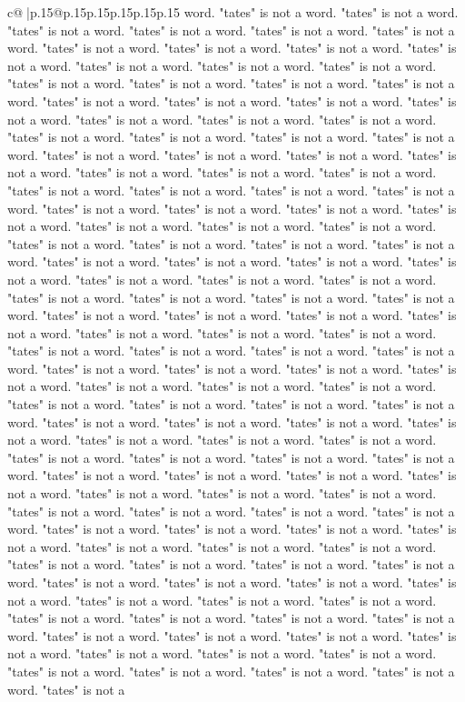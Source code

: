 \documentclass{article}
\begin{document}
{\begin{supertabular}{c@{$\;$}|p{.15\linewidth}@{}p{.15\linewidth}p{.15\linewidth}p{.15\linewidth}p{.15\linewidth}p{.15\linewidth}}
{{{word. "tates" is not a word. "tates" is not a word. "tates" is not a word. "tates" is not a word. "tates" is not a word. "tates" is not a word. "tates" is not a word. "tates" is not a word. "tates" is not a word. "tates" is not a word. "tates" is not a word. "tates" is not a word. "tates" is not a word. "tates" is not a word. "tates" is not a word. "tates" is not a word. "tates" is not a word. "tates" is not a word. "tates" is not a word. "tates" is not a word. "tates" is not a word. "tates" is not a word. "tates" is not a word. "tates" is not a word. "tates" is not a word. "tates" is not a word. "tates" is not a word. "tates" is not a word. "tates" is not a word. "tates" is not a word. "tates" is not a word. "tates" is not a word. "tates" is not a word. "tates" is not a word. "tates" is not a word. "tates" is not a word. "tates" is not a word. "tates" is not a word. "tates" is not a word. "tates" is not a word. "tates" is not a word. "tates" is not a word. "tates" is not a word. "tates" is not a word. "tates" is not a word. "tates" is not a word. "tates" is not a word. "tates" is not a word. "tates" is not a word. "tates" is not a word. "tates" is not a word. "tates" is not a word. "tates" is not a word. "tates" is not a word. "tates" is not a word. "tates" is not a word. "tates" is not a word. "tates" is not a word. "tates" is not a word. "tates" is not a word. "tates" is not a word. "tates" is not a word. "tates" is not a word. "tates" is not a word. "tates" is not a word. "tates" is not a word. "tates" is not a word. "tates" is not a word. "tates" is not a word. "tates" is not a word. "tates" is not a word. "tates" is not a word. "tates" is not a word. "tates" is not a word. "tates" is not a word. "tates" is not a word. "tates" is not a word. "tates" is not a word. "tates" is not a word. "tates" is not a word. "tates" is not a word. "tates" is not a word. "tates" is not a word. "tates" is not a word. "tates" is not a word. "tates" is not a word. "tates" is not a word. "tates" is not a word. "tates" is not a word. "tates" is not a word. "tates" is not a word. "tates" is not a word. "tates" is not a word. "tates" is not a word. "tates" is not a word. "tates" is not a word. "tates" is not a word. "tates" is not a word. "tates" is not a word. "tates" is not a word. "tates" is not a word. "tates" is not a word. "tates" is not a word. "tates" is not a word. "tates" is not a word. "tates" is not a word. "tates" is not a word. "tates" is not a word. "tates" is not a word. "tates" is not a word. "tates" is not a word. "tates" is not a word. "tates" is not a word. "tates" is not a word. "tates" is not a word. "tates" is not a word. "tates" is not a word. "tates" is not a word. "tates" is not a word. "tates" is not a word. "tates" is not a word. "tates" is not a word. "tates" is not a word. "tates" is not a word. "tates" is not a word. "tates" is not a word. "tates" is not a word. "tates" is not a word. "tates" is not a word. "tates" is not a word. "tates" is not a word. "tates" is not a word. "tates" is not a word. "tates" is not a word. "tates" is not a word. "tates" is not a word. "tates" is not a word. "tates" is not a word. "tates" is not a }}}
\end{supertabular}}
\end{document}
